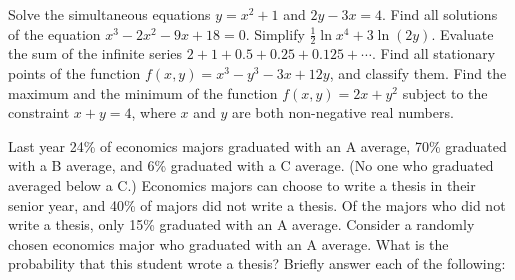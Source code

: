 \documentclass[addpoints,12pt]{exam}
\begin{document}
\begin{questions}

\question Solve the simultaneous equations $y = x^2 + 1$ and $2y - 3x = 4$.
\question Find all solutions of the equation $x^3 - 2x^2 - 9x + 18 = 0$.
\question Simplify $\frac{1}{2}\ln x^4 + 3\ln(2y)$.
\question Evaluate the sum of the infinite series $2 + 1 + 0.5 + 0.25 + 0.125 + \cdots$.
\question Find all stationary points of the function $f(x,y) = x^3 - y^3 - 3x + 12y$, and classify them.
\question Find the maximum and the minimum of the function $f(x,y) = 2x + y^2$ subject to the constraint $x + y = 4$, where $x$ and $y$ are both non-negative real numbers.



\item Last year 24\% of economics majors graduated with an A average, 70\% graduated with a B average, and 6\% graduated with a C average. (No one who graduated averaged below a C.) Economics majors can choose to write a thesis in their senior year, and 40\% of majors did not write a thesis. Of the majors who did not write a thesis, only 15\% graduated with an A average. Consider a randomly chosen economics major who graduated with an A average. What is the probability that this student wrote a thesis?
\question Briefly answer each of the following:



\end{questions}
\end{document}
